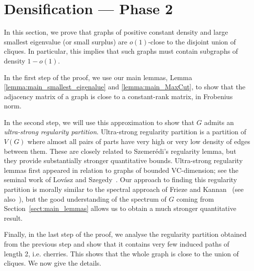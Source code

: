 \documentclass[11pt]{article}
\theoremstyle{plain}
\theoremstyle{definition}
\begin{document}

\section{Densification --- Phase 2}\label{sect:dens2}

In this section, we prove that graphs of positive constant density and large smallest eigenvalue (or small surplus) are $o(1)$-close to the disjoint union of cliques. In particular, this implies that such graphs must contain subgraphs of density $1-o(1)$. 

In the first step of the proof, we use our main lemmas, Lemma \ref{lemma:main_smallest_eigenalue} and \ref{lemma:main_MaxCut}, to show that the adjacency matrix of a graph is close to a constant-rank matrix, in Frobenius norm. 

In the second step, we will use this approximation to show that $G$ admits an \emph{ultra-strong regularity partition}. Ultra-strong regularity partition is a partition of $V(G)$ where almost all pairs of parts have very high or very low density of edges between them. These are closely related to Szemer\'edi's regularity lemma, but they provide substantially stronger quantitative bounds. Ultra-strong regularity lemmas first appeared in relation to graphs of bounded VC-dimension; see the seminal work of Lov\'asz and Szegedy~\cite{LSz}. Our approach to finding this regularity partition is morally similar to the spectral approach of Frieze and Kannan~\cite{FK} (see also~\cite{T12}), but the good understanding of the spectrum of $G$ coming from Section~\ref{sect:main_lemmas} allows us to obtain a much stronger quantitative result.

Finally, in the last step of the proof, we analyse the regularity partition obtained from the previous step and show that it contains very few induced paths of length 2, i.e. cherries. This shows that the whole graph is close to the union of cliques. We now give the details. 
\end{document}

